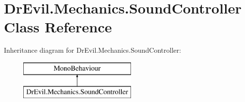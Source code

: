 \hypertarget{class_dr_evil_1_1_mechanics_1_1_sound_controller}{}\section{Dr\+Evil.\+Mechanics.\+Sound\+Controller Class Reference}
\label{class_dr_evil_1_1_mechanics_1_1_sound_controller}
Inheritance diagram for Dr\+Evil.\+Mechanics.\+Sound\+Controller\+:\begin{figure}[H]
\begin{center}
\leavevmode
\includegraphics[height=2.000000cm]{class_dr_evil_1_1_mechanics_1_1_sound_controller}
\end{center}
\end{figure}

